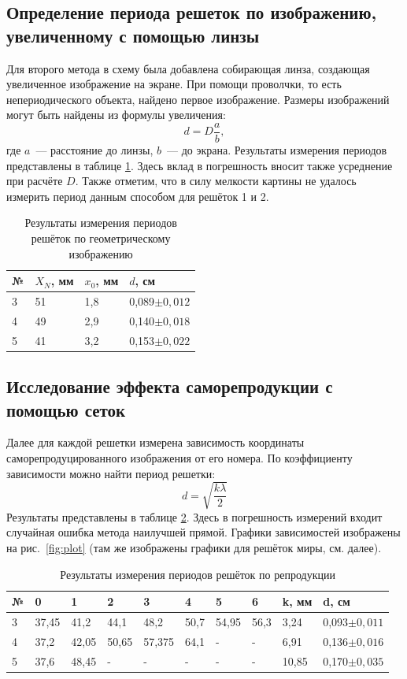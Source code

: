\subsection{Определение периода решеток по изображению, увеличенному с помощью линзы}
Для второго метода в схему была добавлена собирающая линза, создающая увеличенное изображение на экране. При помощи проволчки, то есть непериодического объекта, найдено первое изображение. Размеры изображений могут быть найдены из формулы увеличения:
\[
d = D \frac ab,
\]
где $a$~--- расстояние до линзы, $b$~--- до экрана. Результаты измерения периодов представлены в таблице \ref{tab2}. Здесь вклад в погрешность вносит также усреднение при расчёте $D$. Также отметим, что в силу мелкости картины не удалось измерить период данным способом для решёток 1 и 2.
\begin{table}[!ht]
    \centering
    \begin{tabular}{|l|l|l|l|}
    \hline
        № & $X_N$, мм & $x_0$, мм & $d$, см \\ \hline
        3 & 51 & 1,8 & 0,089$\pm0,012$ \\ \hline
        4 & 49 & 2,9 & 0,140$\pm0,018$ \\ \hline
        5 & 41 & 3,2 & 0,153$\pm0,022$ \\ \hline
    \end{tabular}
    \caption{Результаты измерения периодов решёток по геометрическому изображению}
    \label{tab2}
\end{table}

\subsection{Исследование эффекта саморепродукции с помощью сеток}
Далее для каждой решетки измерена зависимость координаты саморепродуцированного изображения от его номера. По коэффициенту зависимости можно найти период решетки:
\[
d = \sqrt{ \frac{k\lambda}{2} }
\]
Результаты представлены в таблице \ref{tab3}. Здесь в погрешность измерений входит случайная ошибка метода наилучшей прямой. Графики зависимостей изображены на рис.~\ref{fig:plot} (там же изображены графики для решёток миры, см. далее).

\begin{table}[!ht]
    \centering
    \begin{tabular}{|l|l|l|l|l|l|l|l|l|l|}
    \hline
        № & 0 & 1 & 2 & 3 & 4 & 5 & 6 & k, мм & d, см \\ \hline
        3 & 37,45 & 41,2 & 44,1 & 48,2 & 50,7 & 54,95 & 56,3 & 3,24 & 0,093$\pm0,011$ \\ \hline
        4 & 37,2 & 42,05 & 50,65 & 57,375 & 64,1 & - & - & 6,91 & 0,136$\pm0,016$ \\ \hline
        5 & 37,6 & 48,45 & - & - & - & - & - & 10,85 & 0,170$\pm0,035$ \\ \hline
    \end{tabular}
    \caption{Результаты измерения периодов решёток по репродукции}
    \label{tab3}
\end{table}

